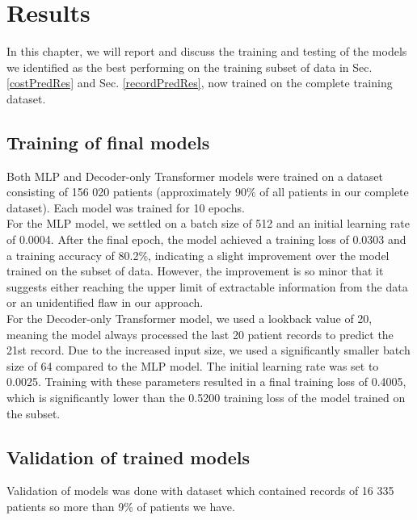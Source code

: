 
\chapter{Results} \label{chap:results}

In this chapter, we will report and discuss the training and testing of the models we identified as the best performing on the training subset of data in Sec. \ref{costPredRes} and Sec. \ref{recordPredRes}, now trained on the complete training dataset.
\\

\section{Training of final models}
\label{modelTrain}

Both MLP and Decoder-only Transformer models were trained on a dataset consisting of 156 020 patients (approximately 90\% of all patients in our complete dataset). Each model was trained for 10 epochs.
\\

For the MLP model, we settled on a batch size of 512 and an initial learning rate of 0.0004. After the final epoch, the model achieved a training loss of 0.0303 and a training accuracy of 80.2\%, indicating a slight improvement over the model trained on the subset of data. However, the improvement is so minor that it suggests either reaching the upper limit of extractable information from the data or an unidentified flaw in our approach.
\\

For the Decoder-only Transformer model, we used a lookback value of 20, meaning the model always processed the last 20 patient records to predict the 21st record. Due to the increased input size, we used a significantly smaller batch size of 64 compared to the MLP model. The initial learning rate was set to 0.0025. Training with these parameters resulted in a final training loss of 0.4005, which is significantly lower than the 0.5200 training loss of the model trained on the subset.

\section{Validation of trained models}
\label{modelValid}

Validation of models was done with dataset which contained records of 16 335 patients so more than 9\% of patients we have.
\\

